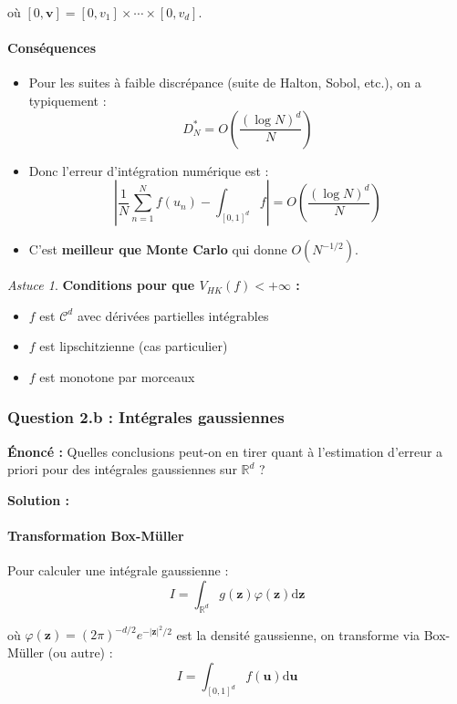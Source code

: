 \documentclass[12pt,a4paper]{article}
\theoremstyle{definition}
\theoremstyle{remark}
\newtheorem*{astuce}{Astuce}
\newcommand{\R}{\mathbb{R}}
\newcommand{\dd}{\mathrm{d}}
\begin{document}
où $[0,\mathbf{v}] = [0,v_1] \times \cdots \times [0,v_d]$.

\paragraph{Conséquences}

\begin{itemize}
\item Pour les suites à faible discrépance (suite de Halton, Sobol, etc.), on a typiquement :
\[
D_N^* = O\left(\frac{(\log N)^d}{N}\right)
\]

\item Donc l'erreur d'intégration numérique est :
\[
\left|\frac{1}{N}\sum_{n=1}^N f(u_n) - \int_{[0,1]^d} f\right| = O\left(\frac{(\log N)^d}{N}\right)
\]

\item C'est \textbf{meilleur que Monte Carlo} qui donne $O(N^{-1/2})$.
\end{itemize}

\begin{astuce}
\textbf{Conditions pour que $V_{HK}(f) < +\infty$ :}
\begin{itemize}
\item $f$ est $\mathcal{C}^d$ avec dérivées partielles intégrables
\item $f$ est lipschitzienne (cas particulier)
\item $f$ est monotone par morceaux
\end{itemize}
\end{astuce}

\subsubsection{Question 2.b : Intégrales gaussiennes}

\textbf{Énoncé :} Quelles conclusions peut-on en tirer quant à l'estimation d'erreur a priori pour des intégrales gaussiennes sur $\R^d$ ?

\textbf{Solution :}

\paragraph{Transformation Box-Müller}

Pour calculer une intégrale gaussienne :
\[
I = \int_{\R^d} g(\mathbf{z})\varphi(\mathbf{z})\dd \mathbf{z}
\]

où $\varphi(\mathbf{z}) = (2\pi)^{-d/2}e^{-|\mathbf{z}|^2/2}$ est la densité gaussienne, on transforme via Box-Müller (ou autre) :
\[
I = \int_{[0,1]^d} f(\mathbf{u})\dd \mathbf{u}
\]
\end{document}

